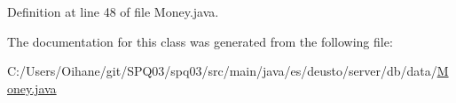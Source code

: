 Definition at line 48 of file Money.\+java.



The documentation for this class was generated from the following file\+:\begin{DoxyCompactItemize}
\item 
C\+:/\+Users/\+Oihane/git/\+S\+P\+Q03/spq03/src/main/java/es/deusto/server/db/data/\hyperlink{_money_8java}{Money.\+java}\end{DoxyCompactItemize}

